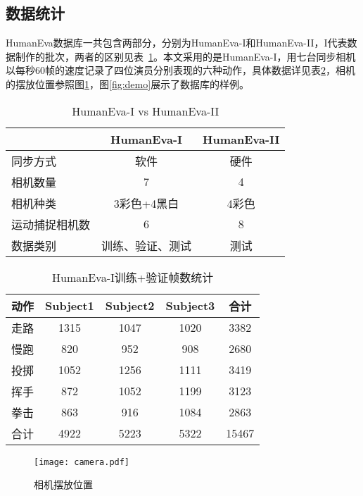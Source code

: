 \subsection{数据统计}
HumanEva数据库一共包含两部分，分别为HumanEva-I和HumanEva-II，I代表数据制作的批次，两者的区别见表~\ref{tab:I-II}。本文采用的是HumanEva-I，用七台同步相机以每秒60帧的速度记录了四位演员分别表现的六种动作，具体数据详见表\ref{tab:totalframes}，相机的摆放位置参照图\ref{fig:camera}，图\ref{fig:demo}展示了数据库的样例。
\begin{table}[htbp]
  \centering
  \caption{HumanEva-I vs HumanEva-II}
  \label{tab:I-II}
    \begin{tabular}{lcc}
      \toprule[1.5pt]
       & HumanEva-I & HumanEva-II \\\midrule[1pt]
      同步方式 & 软件 & 硬件\\
      相机数量 & 7 & 4\\
      相机种类 & 3彩色+4黑白 & 4彩色\\
      运动捕捉相机数 & 6 & 8\\
      数据类别 & 训练、验证、测试 & 测试\\
      \bottomrule[1.5pt]
    \end{tabular}
\end{table}

\begin{table}[htbp]
  \centering
  \caption{HumanEva-I训练+验证帧数统计}
  \label{tab:totalframes}
    \begin{tabular}{lcccc}
      \toprule[1.5pt]
      动作 & Subject1 & Subject2 & Subject3 & 合计 \\\midrule[1pt]
      走路 & 1315 & 1047 & 1020 & 3382 \\
      慢跑 & 820 & 952 & 908 & 2680 \\
      投掷 & 1052 & 1256 & 1111 & 3419 \\
      挥手 & 872 & 1052 & 1199 & 3123 \\
      拳击 & 863 & 916 & 1084 & 2863 \\
      合计 & 4922 & 5223 & 5322 & 15467\\
      \bottomrule[1.5pt]
    \end{tabular}
\end{table}

\begin{figure}[htbp]
  \centering
  \texttt{[image: camera.pdf]}\\
  \caption{相机摆放位置}\label{fig:camera}
\end{figure}

